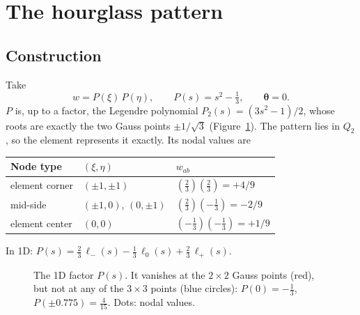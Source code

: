 \documentclass[11pt]{article}
\begin{document}
\section{The hourglass pattern}

\subsection{Construction}
Take
\begin{equation}
  w = P(\xi)\,P(\eta), \qquad P(s) = s^2 - \tfrac13, \qquad \boldsymbol{\theta} = 0 .
\end{equation}
$P$ is, up to a factor, the Legendre polynomial $P_2(s) = (3s^2 - 1)/2$, whose roots
are exactly the two Gauss points $\pm 1/\sqrt{3}$ (Figure~\ref{fig:factor}). The
pattern lies in $Q_2$, so the element represents it exactly. Its nodal values are
\begin{center}
\begin{tabular}{|l|l|l|}
\hline
Node type & $(\xi, \eta)$ & $w_{ab}$ \\
\hline
element corner & $(\pm 1, \pm 1)$ & $(\tfrac23)(\tfrac23) = +4/9$ \\
mid-side & $(\pm 1, 0)$, $(0, \pm 1)$ & $(\tfrac23)(-\tfrac13) = -2/9$ \\
element center & $(0, 0)$ & $(-\tfrac13)(-\tfrac13) = +1/9$ \\
\hline
\end{tabular}
\end{center}
In 1D: $P(s) = \tfrac23\,\ell_-(s) - \tfrac13\,\ell_0(s) + \tfrac23\,\ell_+(s)$.

\begin{figure}[htbp]
\centering
{}
\caption{The 1D factor $P(s)$. It vanishes at the $2\times 2$ Gauss points (red),
but not at any of the $3\times 3$ points (blue circles): $P(0) = -\frac13$,
$P(\pm 0.775) = \frac{4}{15}$. Dots: nodal values.}
\label{fig:factor}
\end{figure}
\end{document}
